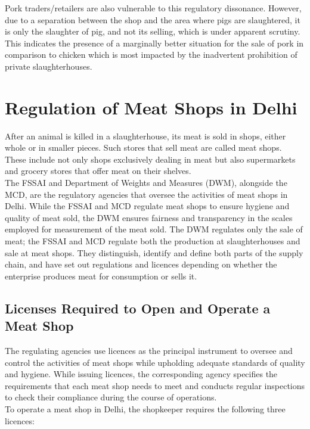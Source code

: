 \documentclass[a4paper, 12pt]{article}
\begin{document}
Pork traders/retailers are also vulnerable to this regulatory dissonance. However, due to a separation between the shop and the area where pigs are slaughtered, it is only the slaughter of pig, and not its selling, which is under apparent scrutiny. This indicates the presence of a marginally better situation for the sale of pork in comparison to chicken which is most impacted by the inadvertent prohibition of private slaughterhouses. 

\section{Regulation of Meat Shops in Delhi}

After an animal is killed in a slaughterhouse, its meat is sold in shops, either whole or in smaller pieces. Such stores that sell meat are called meat shops. These include not only shops exclusively dealing in meat but also supermarkets and grocery stores that offer meat on their shelves.\\

The FSSAI and Department of Weights and Measures (DWM), alongside the MCD, are the regulatory agencies that oversee the activities of meat shops in Delhi. While the FSSAI and MCD regulate meat shops to ensure hygiene and quality of meat sold, the DWM ensures fairness and transparency in the scales employed for measurement of the meat sold. The DWM regulates only the sale of meat; the FSSAI and MCD regulate both the production at slaughterhouses and sale at meat shops. They distinguish, identify and define both parts of the supply chain, and have set out regulations and licences depending on whether the enterprise produces meat for consumption or sells it. 

\subsection{Licenses Required to Open and Operate a Meat Shop}

The regulating agencies use licences as the principal instrument to oversee and control the activities of meat shops while upholding adequate standards of quality and hygiene. While issuing licences, the corresponding agency specifies the requirements that each meat shop needs to meet and conducts regular inspections to check their compliance during the course of operations. \\

To operate a meat shop in Delhi, the shopkeeper requires the following three licences:
\end{document}
